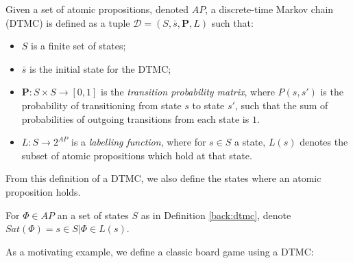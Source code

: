 \begin{definition}
\label{back:dtmc}
    Given a set of atomic propositions, denoted $AP$, a discrete-time Markov chain (DTMC) is defined as a tuple $\mathcal{D} = (S, \bar{s}, \mathbf{P}, L)$ such that:

    \begin{itemize}
        \item $S$ is a finite set of states;
        \item $\bar{s}$ is the initial state for the DTMC;
        \item $\mathbf{P} : S \times S \rightarrow [0,1]$ is the \emph{transition probability matrix}, where $P(s, s')$ is the probability of transitioning from state $s$ to state $s'$, such that the sum of probabilities of outgoing transitions from each state is $1$.
        \item $L: S \rightarrow 2^{AP}$ is a \emph{labelling function}, where for $s \in S$ a state, $L(s)$ denotes the subset of atomic propositions which hold at that state.
    \end{itemize}

\end{definition}


From this definition of a DTMC, we also define the states where an atomic proposition holds.

\begin{definition}
\label{back:sat}

    For $\Phi \in AP$ an a set of states $S$ as in Definition \ref{back:dtmc}, denote $Sat(\Phi) = {s \in S | \Phi \in L(s)}$.

\end{definition}


As a motivating example, we define a classic board game using a DTMC:

